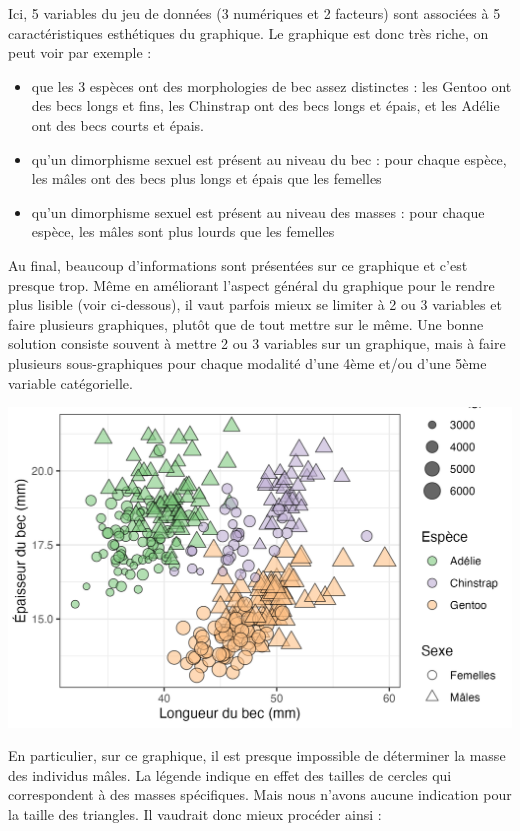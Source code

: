 \documentclass[
  letterpaper,
  DIV=11,
  numbers=noendperiod]{scrreprt}
\providecommand{\tightlist}{%
  \setlength{\itemsep}{0pt}\setlength{\parskip}{0pt}}\usepackage{longtable,booktabs,array}
\begin{document}
Ici, 5 variables du jeu de données (3 numériques et 2 facteurs) sont
associées à 5 caractéristiques esthétiques du graphique. Le graphique
est donc très riche, on peut voir par exemple :

\begin{itemize}
\tightlist
\item
  que les 3 espèces ont des morphologies de bec assez distinctes : les
  Gentoo ont des becs longs et fins, les Chinstrap ont des becs longs et
  épais, et les Adélie ont des becs courts et épais.
\item
  qu'un dimorphisme sexuel est présent au niveau du bec : pour chaque
  espèce, les mâles ont des becs plus longs et épais que les femelles
\item
  qu'un dimorphisme sexuel est présent au niveau des masses : pour
  chaque espèce, les mâles sont plus lourds que les femelles
\end{itemize}

Au final, beaucoup d'informations sont présentées sur ce graphique et
c'est presque trop. Même en améliorant l'aspect général du graphique
pour le rendre plus lisible (voir ci-dessous), il vaut parfois mieux se
limiter à 2 ou 3 variables et faire plusieurs graphiques, plutôt que de
tout mettre sur le même. Une bonne solution consiste souvent à mettre 2
ou 3 variables sur un graphique, mais à faire plusieurs sous-graphiques
pour chaque modalité d'une 4ème et/ou d'une 5ème variable catégorielle.

\includegraphics{./03-visualization_files/figure-pdf/unnamed-chunk-79-1.png}

En particulier, sur ce graphique, il est presque impossible de
déterminer la masse des individus mâles. La légende indique en effet des
tailles de cercles qui correspondent à des masses spécifiques. Mais nous
n'avons aucune indication pour la taille des triangles. Il vaudrait donc
mieux procéder ainsi :
\end{document}
